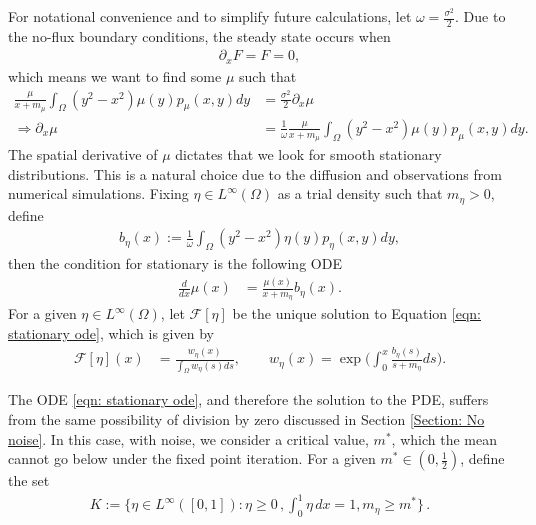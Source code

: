 \documentclass[10pt]{article}
\begin{document}
For notational convenience and to simplify future calculations, let $\omega = \frac{\sigma^2}{2}$. Due to the no-flux boundary conditions, the steady state occurs when
\begin{align*}
    \partial_xF = F = 0,
\end{align*}
which means we want to find some $\mu$ such that
\begin{align*}
    \frac{\mu}{x+m_\mu}\int_{\Omega}(y^2-x^2)\mu(y)p_\mu(x,y)dy&= \frac{\sigma^2}{2}\partial_x \mu\\
   \Rightarrow \partial_x\mu &=\frac{1}{\omega}\frac{\mu}{x+m_\mu}\int_{\Omega}(y^2-x^2)\mu(y)p_\mu(x,y)dy.
\end{align*}
The spatial derivative of $\mu$ dictates that we look for smooth stationary distributions. This is a natural choice due to the diffusion and observations from numerical simulations. Fixing $\eta\in L^\infty(\Omega)$ as a trial density such that $m_\eta > 0$, define
\begin{align*}
    b_\eta(x) := \frac{1}{\omega}\int_{\Omega}(y^2-x^2)\eta(y)p_{\eta}(x,y)dy,
\end{align*}
then the condition for stationary is the following ODE
\begin{align}\label{eqn: stationary ode}
     \frac{d}{dx}\mu(x) &= \frac{\mu(x)}{x+m_\eta}b_\eta(x).
\end{align}
For a given $\eta\in L^\infty(\Omega)$, let $\mathcal{F}[\eta]$ be the unique solution to Equation \eqref{eqn: stationary ode}, which is given by
\begin{align} \label{eqn: solution to stationary distribution ODE}
\mathcal{F}[\eta](x) &= \frac{w_\eta(x)}{\int_{\Omega} w_\eta(s)ds},\qquad w_\eta(x) = \exp\Big(\int_0^x \frac{b_\eta(s)}{s+m_\eta}ds\Big).
\end{align}

The ODE \eqref{eqn: stationary ode}, and therefore the solution to the PDE, suffers from the same possibility of division by zero discussed in Section \ref{Section: No noise}. In this case, with noise, we consider a critical value, $m^*$, which the mean cannot go below under the fixed point iteration. For a given $m^* \in (0,\frac{1}{2})$, define the set 
\begin{align}\label{set of trial densities K}
    K:=\bigg\{\eta \in L^\infty([0,1]) : \eta\geq0\,, \int^1_0\eta\,dx=1,  m_\eta \geq m^*\bigg\} \,.
\end{align}
\end{document}
